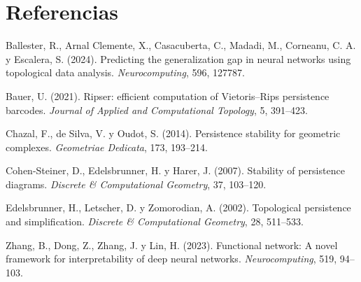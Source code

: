 \documentclass[11pt,a4paper]{article}
\theoremstyle{plain}
\theoremstyle{remark}
\begin{document}
\section*{Referencias}
\begin{list}{}{\setlength{\leftmargin}{1.2em}\setlength{\itemindent}{-1.2em}}
\item Ballester, R., Arnal Clemente, X., Casacuberta, C., Madadi, M., Corneanu, C. A. y Escalera, S. (2024). Predicting the generalization gap in neural networks using topological data analysis. \emph{Neurocomputing}, 596, 127787.
\item Bauer, U. (2021). Ripser: efficient computation of Vietoris--Rips persistence barcodes. \emph{Journal of Applied and Computational Topology}, 5, 391--423.
\item Chazal, F., de Silva, V. y Oudot, S. (2014). Persistence stability for geometric complexes. \emph{Geometriae Dedicata}, 173, 193--214.
\item Cohen-Steiner, D., Edelsbrunner, H. y Harer, J. (2007). Stability of persistence diagrams. \emph{Discrete \& Computational Geometry}, 37, 103--120.
\item Edelsbrunner, H., Letscher, D. y Zomorodian, A. (2002). Topological persistence and simplification. \emph{Discrete \& Computational Geometry}, 28, 511--533.
\item Zhang, B., Dong, Z., Zhang, J. y Lin, H. (2023). Functional network: A novel framework for interpretability of deep neural networks. \emph{Neurocomputing}, 519, 94--103.
\end{list}
\end{document}
